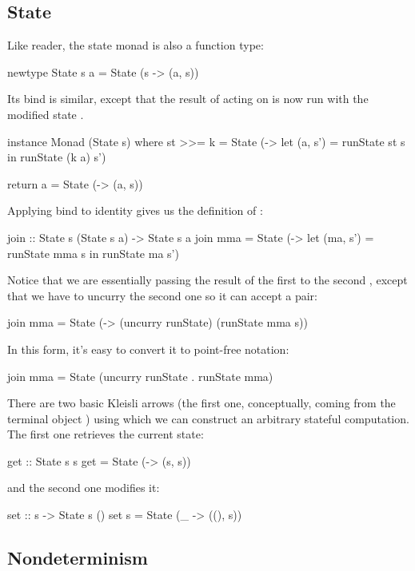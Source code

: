\documentclass[DaoFP]{subfiles}
\begin{document}
\subsection{State}
Like reader, the state monad is also a function type:
\begin{haskell}
newtype State s a = State (s -> (a, s))
\end{haskell}
Its bind is similar, except that the result of  acting on   is now run with the modified state .
\begin{haskell}
instance Monad (State s) where
  st >>= k = State (\s -> let (a, s') = runState st s
                          in runState (k a) s')
                          
  return a = State (\s -> (a, s))
\end{haskell}

Applying bind to identity gives us the definition of :
\begin{haskell}
join :: State s (State s a) -> State s a
join mma = State (\s -> let (ma, s') = runState mma s
                        in runState ma s')
\end{haskell}
Notice that we are essentially passing the result of the first  to the second , except that we have to uncurry the second one so it can accept a pair:
                             
\begin{haskell}
join mma = State (\s -> (uncurry runState) (runState mma s))
\end{haskell}
In this form, it's easy to convert it to point-free notation:
\begin{haskell}
join mma = State (uncurry runState . runState mma)
\end{haskell}

There are two basic Kleisli arrows (the first one, conceptually, coming from the terminal object \hask{()}) using which we can construct an arbitrary stateful computation. The first one retrieves the current state:
\begin{haskell}
get :: State s s
get = State (\s -> (s, s))
\end{haskell}
and the second one modifies it:
\begin{haskell}
set :: s -> State s ()
set s = State (\_ -> ((), s))
\end{haskell}

\subsection{Nondeterminism}
\end{document}
